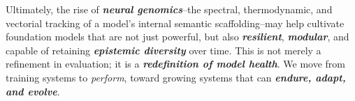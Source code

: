 \vspace{0.5em}
\noindent Ultimately, the rise of \textbf{\emph{neural genomics}}--the spectral, thermodynamic, and vectorial tracking of a model’s internal semantic scaffolding--may help cultivate foundation models that are not just powerful, but also \textbf{\emph{resilient}}, \textbf{\emph{modular}}, and capable of retaining \textbf{\emph{epistemic diversity}} over time. This is not merely a refinement in evaluation; it is a \textbf{\emph{redefinition of model health}}. We move from training systems to \emph{perform}, toward growing systems that can \textbf{\emph{endure, adapt, and evolve}}.




